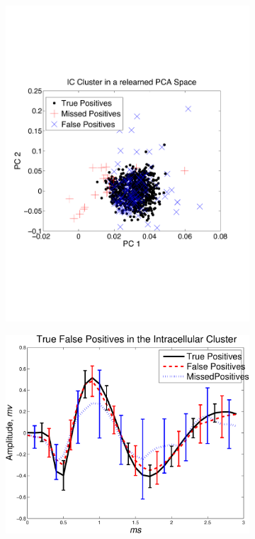 \begin{center}
\begin{figure}[h!]
\begin{subfigure}[b]{.33\textwidth}
\includegraphics[width=\textwidth]{../figs/new/ICclusternewpca.pdf}
\caption{}
\label{fig:ICnew}
\end{subfigure}
\begin{subfigure}[b]{.33\textwidth}
\includegraphics[width=\textwidth]{../figs/IntracellularTrueFalsePositivesv2}

\end{subfigure}
\end{figure}
\end{center}
